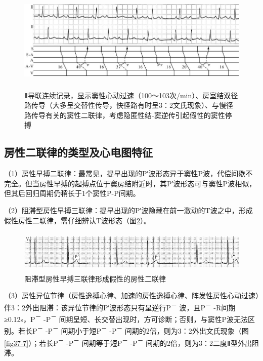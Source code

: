 \begin{figure}[!htbp]
 \centering
 \includegraphics[width=5.84375in,height=1.96875in]{./images/Image00599.jpg}
 \captionsetup{justification=centering}
 \caption{Ⅱ导联连续记录，显示窦性心动过速（100～103次/min）、房室结双径路传导（大多呈交替性传导，快径路有时呈3：2文氏现象）、与慢径路传导有关的窦性二联律，考虑隐匿性结-窦逆传引起假性的窦性停搏}
 \label{fig37-5}
  \end{figure} 

\protect\hypertarget{text00044.htmlux5cux23subid483}{}{}

\subsection{房性二联律的类型及心电图特征}

（1）房性早搏二联律：最常见，提早出现的P′波形态异于窦性P波，代偿间歇不完全。但当房性早搏的起搏点位于窦房结附近时，其P′波形态可与窦性P波相似，但其后回归周期仍稍长于1个窦性P-P间期。

（2）阻滞型房性早搏三联律：提早出现的P′波隐藏在前一激动的T波之中，形成假性房性二联律，需仔细辨认T波形态（图\ref{fig37-6}）。

\begin{figure}[!htbp]
 \centering
 \includegraphics[width=5.58333in,height=0.80208in]{./images/Image00600.jpg}
 \captionsetup{justification=centering}
 \caption{阻滞型房性早搏三联律形成假性的房性二联律}
 \label{fig37-6}
  \end{figure} 

（3）房性异位节律（房性逸搏心律、加速的房性逸搏心律、阵发性房性心动过速）伴3：2外出阻滞：该异位节律的P′波形态只有呈逆行P\textsuperscript{－}
波，且P\textsuperscript{－} -R间期≥0.12s，P\textsuperscript{－}
-P\textsuperscript{－}
间期呈短、长交替出现时，方可诊断；否则，与窦性P波无法区别。若长P\textsuperscript{－}
-P\textsuperscript{－} 间期小于短P\textsuperscript{－}
-P\textsuperscript{－}
间期的2倍，则为3：2外出文氏现象（图\ref{fig37-7}）；若长P\textsuperscript{－}
-P\textsuperscript{－} 间期等于短P\textsuperscript{－}
-P\textsuperscript{－} 间期的2倍，则为3：2二度Ⅱ型外出阻滞。

